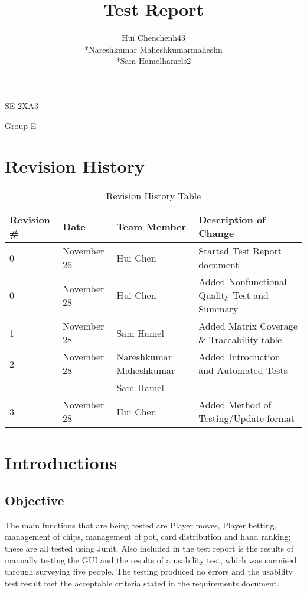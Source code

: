\documentclass[11pt]{article}
\begin{document}
	\begin{titlepage}
	\title {Test Report}
	\maketitle
		\begin{center}
		SE 2XA3\\
		\author{
		Hui Chen\hspace{128pt}chenh43	
		\\*Nareshkumar Maheshkumar\hspace{35pt}maheshn 
		\\*Sam Hamel\hspace{118pt}hamels2 \\
		}

		Group E
		\end{center}
	\end{titlepage}
	
	\newpage
	\tableofcontents
	\listoftables
	\newpage
	
	\section{Revision History}
	\begin{table}[h]
	\caption{Revision History Table}
	\begin{tabular}{|l|l|p{3cm}|p{6cm}|}
  	\hline
  	Revision \# & Date & Team Member & Description of Change\\
  	\hline
  	0 & November 26 & Hui Chen & Started Test Report document\\
  	\hline
  	0 & November 28 & Hui Chen & Added Nonfunctional Quality Test and Summary\\
  	\hline
  	1 & November 28 & Sam Hamel & Added Matrix Coverage \& Traceability table\\
  	\hline
  	2 & November 28 & Nareshkumar Maheshkumar & Added Introduction and Automated Tests\\
  	& & Sam Hamel & \\
  	\hline
  	3 & November 28 & Hui Chen & Added Method of Testing/Update format\\
  	\hline
	\end{tabular}
	\end{table}
	\newpage
	
	\section{Introductions}
	\subsection{Objective}
	The main functions that are being tested are Player moves, Player betting, management of chips, management of pot, card distribution and hand ranking; these are all tested using Junit. Also included in the test report is the results of manually testing the GUI and the results of a usability test, which was surmised through surveying five people. The testing produced no errors and the usability test result met the acceptable criteria stated in the requirements document.
\end{document}
